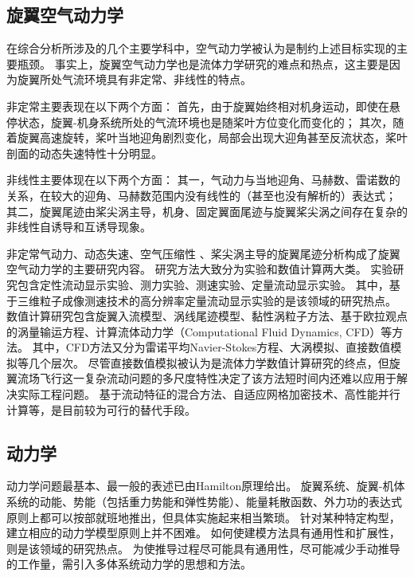 \documentclass[doctor,openright,twoside,color]{buaathesis}
\begin{document}
\subsection{旋翼空气动力学}
在综合分析所涉及的几个主要学科中，空气动力学被认为是制约上述目标实现的主要瓶颈。
事实上，旋翼空气动力学也是流体力学研究的难点和热点，这主要是因为旋翼所处气流环境具有非定常、非线性的特点。

非定常主要表现在以下两个方面：
首先，由于旋翼始终相对机身运动，即使在悬停状态，旋翼-机身系统所处的气流环境也是随桨叶方位变化而变化的；
其次，随着旋翼高速旋转，桨叶当地迎角剧烈变化，局部会出现大迎角甚至反流状态，桨叶剖面的动态失速特性十分明显。

非线性主要体现在以下两个方面：
其一，气动力与当地迎角、马赫数、雷诺数的关系，在较大的迎角、马赫数范围内没有线性的（甚至也没有解析的）表达式；
其二，旋翼尾迹由桨尖涡主导，机身、固定翼面尾迹与旋翼桨尖涡之间存在复杂的非线性自诱导和互诱导现象。

非定常气动力、动态失速、空气压缩性 、桨尖涡主导的旋翼尾迹分析构成了旋翼空气动力学的主要研究内容。
研究方法大致分为实验和数值计算两大类。
实验研究包含定性流动显示实验、测力实验、测速实验、定量流动显示实验。
其中，基于三维粒子成像测速技术的高分辨率定量流动显示实验的是该领域的研究热点。
数值计算研究包含旋翼入流模型、涡线尾迹模型、黏性涡粒子方法、基于欧拉观点的涡量输运方程、计算流体动力学（Computational Fluid Dynamics, CFD）等方法。
其中，CFD方法又分为雷诺平均Navier-Stokes方程、大涡模拟、直接数值模拟等几个层次。
尽管直接数值模拟被认为是流体力学数值计算研究的终点，但旋翼流场飞行这一复杂流动问题的多尺度特性决定了该方法短时间内还难以应用于解决实际工程问题。
基于流动特征的混合方法、自适应网格加密技术、高性能并行计算等，是目前较为可行的替代手段。

\subsection{动力学}
动力学问题最基本、最一般的表述已由Hamilton原理给出。
%
旋翼系统、旋翼-机体系统的动能、势能（包括重力势能和弹性势能）、能量耗散函数、外力功的表达式原则上都可以按部就班地推出，但具体实施起来相当繁琐。
针对某种特定构型，建立相应的动力学模型原则上并不困难。
如何使建模方法具有通用性和扩展性，则是该领域的研究热点。
为使推导过程尽可能具有通用性，尽可能减少手动推导的工作量，需引入多体系统动力学的思想和方法。
\end{document}
